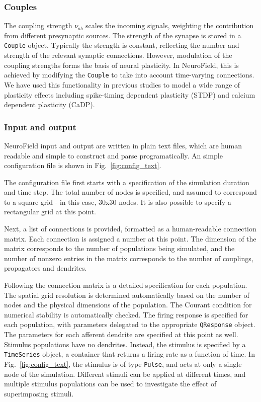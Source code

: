 \documentclass[preprint,review,10pt,authoryear,letterpaper]{elsarticle}
\begin{document}
\subsubsection{Couples}
The coupling strength $\nu_{ab}$ scales the incoming signals, weighting the contribution from different presynaptic sources. The strength of the synapse is stored in a \texttt{Couple} object. Typically the strength is constant, reflecting the number and strength of the relevant synaptic connections. However, modulation of the coupling strengths forms the basis of neural plasticity. In NeuroField, this is achieved by modifying the \texttt{Couple} to take into account time-varying connections. We have used this functionality in previous studies to model a wide range of plasticity effects including spike-timing dependent plasticity (STDP) and calcium dependent plasticity (CaDP). 


\subsubsection{Input and output}
NeuroField input and output are written in plain text files, which are human readable and simple to construct and parse programatically. An simple configuration file is shown in Fig.~\ref{fig:config_text}.  

The configuration file first starts with a specification of the simulation duration and time step. The total number of nodes is specified, and assumed to correspond to a square grid - in this case, 30x30 nodes. It is also possible to specify a rectangular grid at this point. 

Next, a list of connections is provided, formatted as a human-readable connection matrix. Each connection is assigned a number at this point. The dimension of the matrix corresponds to the number of populations being simulated, and the number of nonzero entries in the matrix corresponds to the number of couplings, propagators and dendrites.

Following the connection matrix is a detailed specification for each population. The spatial grid resolution is determined automatically based on the number of nodes and the physical dimensions of the population. The Courant condition for numerical stability is automatically checked. The firing response is specified for each population, with parameters delegated to the appropriate \texttt{QResponse} object. The parameters for each afferent dendrite are specified at this point as well. Stimulus populations have no dendrites. Instead, the stimulus is specified by a \texttt{TimeSeries} object, a container that returns a firing rate as a function of time. In Fig.~\ref{fig:config_text}, the stimulus is of type \texttt{Pulse}, and acts at only a single node of the simulation. Different stimuli can be applied at different times, and multiple stimulus populations can be used to investigate the effect of superimposing stimuli. 
\end{document}
